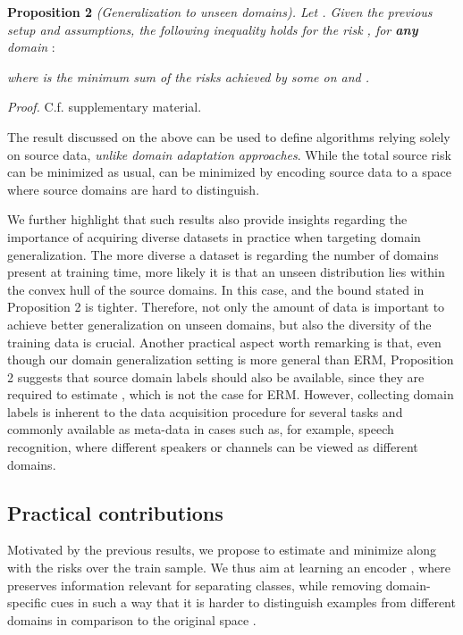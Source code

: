 \documentclass{article}
\begin{document}
\textbf{Proposition 2} \textit{(Generalization to unseen domains). Let . Given the previous setup and assumptions, the following inequality holds for the risk ,  for \textbf{any} domain }:

\textit{where  is the minimum sum of the risks achieved by some  on  and .}

\textit{Proof.} C.f. supplementary material.

The result discussed on the above can be used to define algorithms relying solely on source data, \emph{unlike domain adaptation approaches}. While the total source risk can be minimized as usual,  can be minimized by encoding source data to a space where source domains are hard to distinguish. 

We further highlight that such results also provide insights regarding the importance of acquiring diverse datasets in practice when targeting  domain generalization. The more diverse a dataset is regarding the number of domains present at training time, more likely it is that an unseen distribution lies within the convex hull of the source domains. In this case,  and the bound stated in Proposition 2 is tighter. Therefore, not only the amount of data is important to achieve better  generalization on unseen domains, but also the diversity of the training data is crucial. Another practical aspect worth remarking is that, even though our domain generalization setting is more general than ERM, Proposition 2 suggests that source domain labels should also be available, since they are required to estimate , which is not the case for ERM. However, collecting domain labels is inherent to the data acquisition procedure for several tasks and commonly available as meta-data in cases such as, for example, speech recognition, where different speakers or channels can be viewed as different domains.

\subsection{Practical contributions}
Motivated by the previous results, we propose to estimate and minimize  along with the risks over the train sample. We thus aim at learning an encoder , where  preserves information relevant for separating classes, while removing domain-specific cues in such a way that it is harder to distinguish examples from different domains in comparison to the original space . 
\end{document}
